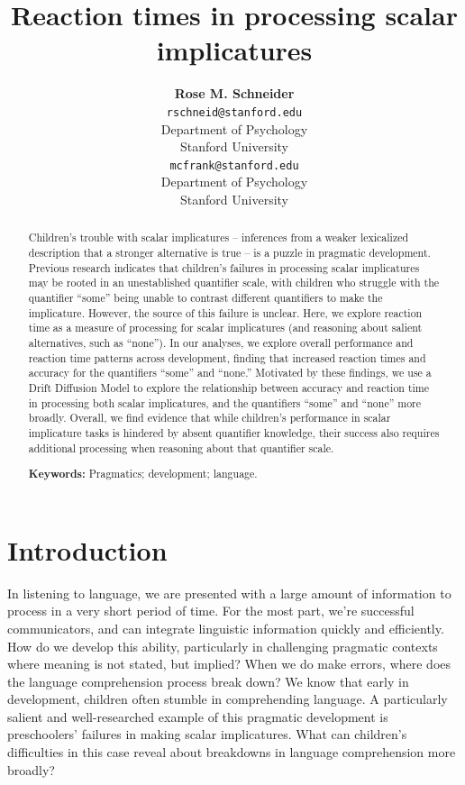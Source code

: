 \documentclass[10pt, letterpaper]{article}
\title{Reaction times in processing scalar implicatures}
\author{{\large \bf Rose M. Schneider} \\ \texttt{rschneid@stanford.edu} \\ Department of Psychology \\ Stanford University \And {\large \bf Michael C. Frank} \\ \texttt{mcfrank@stanford.edu} \\ Department of Psychology \\ Stanford University}
\begin{document}
\maketitle

\begin{abstract}
Children's trouble with scalar implicatures -- inferences from a weaker
lexicalized description that a stronger alternative is true -- is a
puzzle in pragmatic development. Previous research indicates that
children's failures in processing scalar implicatures may be rooted in
an unestablished quantifier scale, with children who struggle with the
quantifier ``some'' being unable to contrast different quantifiers to
make the implicature. However, the source of this failure is unclear.
Here, we explore reaction time as a measure of processing for scalar
implicatures (and reasoning about salient alternatives, such as
``none''). In our analyses, we explore overall performance and reaction
time patterns across development, finding that increased reaction times
and accuracy for the quantifiers ``some'' and ``none.'' Motivated by
these findings, we use a Drift Diffusion Model to explore the
relationship between accuracy and reaction time in processing both
scalar implicatures, and the quantifiers ``some'' and ``none'' more
broadly. Overall, we find evidence that while children's performance in
scalar implicature tasks is hindered by absent quantifier knowledge,
their success also requires additional processing when reasoning about
that quantifier scale.

\textbf{Keywords:}
Pragmatics; development; language.
\end{abstract}

\section{Introduction}\label{introduction}

In listening to language, we are presented with a large amount of
information to process in a very short period of time. For the most
part, we're successful communicators, and can integrate linguistic
information quickly and efficiently. How do we develop this ability,
particularly in challenging pragmatic contexts where meaning is not
stated, but implied? When we do make errors, where does the language
comprehension process break down? We know that early in development,
children often stumble in comprehending language. A particularly salient
and well-researched example of this pragmatic development is
preschoolers' failures in making scalar implicatures. What can
children's difficulties in this case reveal about breakdowns in language
comprehension more broadly?
\end{document}
